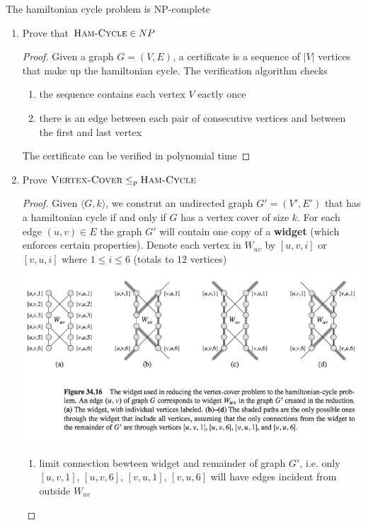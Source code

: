 \documentclass[11pt]{article}
\begin{document}
\begin{theorem*}
    The hamiltonian cycle problem is NP-complete
    \begin{enumerate}
        \item Prove that $\textsc{Ham-Cycle}\in NP$
        \begin{proof}
            Given a graph $G = (V,E)$, a certificate is a sequence of $|V|$ vertices that make up the hamiltonian cycle. The verification algorithm checks 
            \begin{enumerate}
                \item the sequence contains each vertex $V$ eactly once 
                \item there is an edge between each pair of consecutive vertices and between the first and last vertex 
            \end{enumerate}
            The certificate can be verified in polynomial time
        \end{proof}
        \item Prove $\textsc{Vertex-Cover}\leq_p \textsc{Ham-Cycle}$
        \begin{proof}
            Given $\langle G, k \rangle$, we construt an undirected graph $G' = (V', E')$ that has a hamiltonian cycle if and only if $G$ has a vertex cover of size $k$. For each edge $(u,v)\in E$ the graph $G'$ will contain one copy of a \textbf{widget} (which enforces certain properties).  Denote each vertex in $W_{uv}$ by $[u,v,i]$ or $[v,u,i]$ where $1\leq i\leq 6$ (totals to 12 vertices)\\
            \includegraphics[width=\textwidth]{hamcycle_npc.png}
            \begin{enumerate}
                \item limit connection bewteen widget and remainder of graph $G'$, i.e. only $[u,v,1]$, $[u,v,6]$, $[v,u,1]$, $[v,u,6]$ will have edges incident from outside $W_{uv}$

\end{enumerate}
\end{proof}
\end{enumerate}
\end{theorem*}
\end{document}
